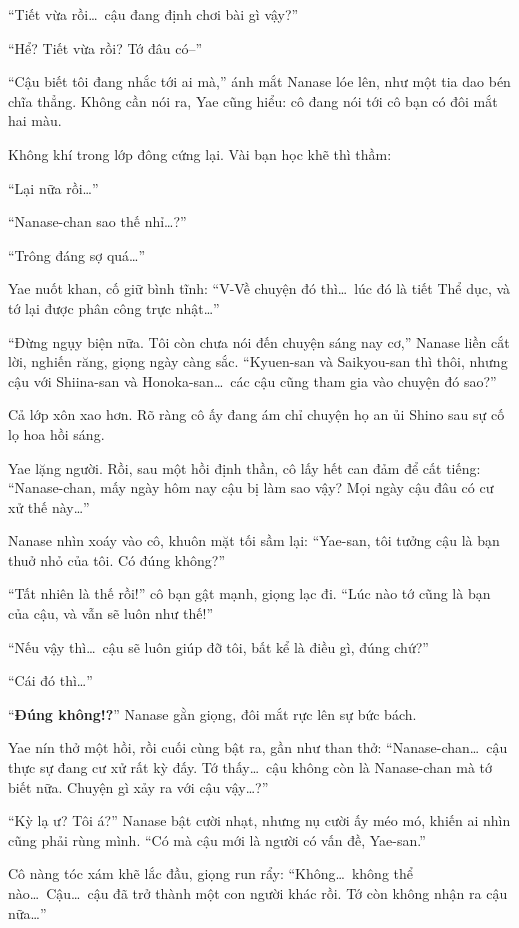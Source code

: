 \documentclass[../main.tex]{subfiles}
\begin{document}
``Tiết vừa rồi\dots\ cậu đang định chơi bài gì vậy?''

``Hể? Tiết vừa rồi? Tớ đâu có--''

``Cậu biết tôi đang nhắc tới ai mà,'' ánh mắt Nanase lóe lên, như một tia dao bén chĩa thẳng. Không cần nói ra, Yae cũng hiểu: cô đang nói tới cô bạn có đôi mắt hai màu.

Không khí trong lớp đông cứng lại. Vài bạn học khẽ thì thầm:

``Lại nữa rồi\dots''

``Nanase-chan sao thế nhỉ\dots?''

``Trông đáng sợ quá\dots''

Yae nuốt khan, cố giữ bình tĩnh: ``V-Về chuyện đó thì\dots\ lúc đó là tiết Thể dục, và tớ lại được phân công trực nhật\dots''

``Đừng ngụy biện nữa. Tôi còn chưa nói đến chuyện sáng nay cơ,'' Nanase liền cắt lời, nghiến răng, giọng ngày càng sắc. ``Kyuen-san và Saikyou-san thì thôi, nhưng cậu với Shiina-san và Honoka-san\dots\ các cậu cũng tham gia vào chuyện đó sao?''

Cả lớp xôn xao hơn. Rõ ràng cô ấy đang ám chỉ chuyện họ an ủi Shino sau sự cố lọ hoa hồi sáng.

Yae lặng người. Rồi, sau một hồi định thần, cô lấy hết can đảm để cất tiếng: ``Nanase-chan, mấy ngày hôm nay cậu bị làm sao vậy? Mọi ngày cậu đâu có cư xử thế này\dots''

Nanase nhìn xoáy vào cô, khuôn mặt tối sầm lại: ``Yae-san, tôi tưởng cậu là bạn thuở nhỏ của tôi. Có đúng không?''

``Tất nhiên là thế rồi!'' cô bạn gật mạnh, giọng lạc đi. ``Lúc nào tớ cũng là bạn của cậu, và vẫn sẽ luôn như thế!''

``Nếu vậy thì\dots\ cậu sẽ luôn giúp đỡ tôi, bất kể là điều gì, đúng chứ?''

``Cái đó thì\dots''

``\textbf{Đúng không!?}'' Nanase gằn giọng, đôi mắt rực lên sự bức bách.

Yae nín thở một hồi, rồi cuối cùng bật ra, gần như than thở: ``Nanase-chan\dots\ cậu thực sự đang cư xử rất kỳ đấy. Tớ thấy\dots\ cậu không còn là Nanase-chan mà tớ biết nữa. Chuyện gì xảy ra với cậu vậy\dots?''

``Kỳ lạ ư? Tôi á?'' Nanase bật cười nhạt, nhưng nụ cười ấy méo mó, khiến ai nhìn cũng phải rùng mình. ``Có mà cậu mới là người có vấn đề, Yae-san.''

Cô nàng tóc xám khẽ lắc đầu, giọng run rẩy: ``Không\dots\ không thể nào\dots\ Cậu\dots\ cậu đã trở thành một con người khác rồi. Tớ còn không nhận ra cậu nữa\dots''
\end{document}
